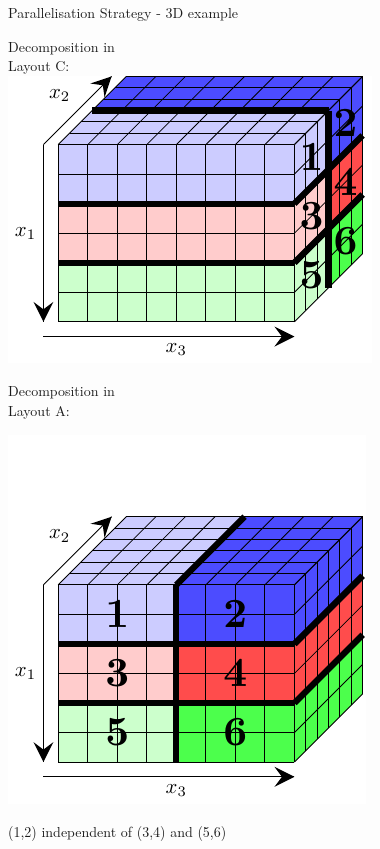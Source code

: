 \documentclass{beamer}
\begin{document}
\begin{frame}{Parallelisation Strategy - 3D example}
\begin{minipage}{.45\textwidth}
 Decomposition in\\ Layout C:\\
 \vspace{1em}
 \includegraphics[width=\textwidth]{Parallel3d/Start}
\end{minipage}
\begin{minipage}{.45\textwidth}
 Decomposition in\\ Layout A:
 
 \vspace{-.7em}
 \includegraphics[width=\textwidth]{Parallel3d/End}
\end{minipage}
 
 (1,2) independent of (3,4) and (5,6)
\end{frame}
\end{document}
